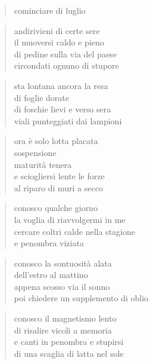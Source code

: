	\begin{verse}
		cominciare di luglio
	\end{verse}

	\begin{verse}
		andirivieni di certe sere\\
		il muoversi caldo e pieno\\
		di pedine sulla via del paese\\
		circondati ognuno di stupore
	\end{verse}

	\begin{verse}
		sta lontana ancora la resa\\
		di foglie dorate\\
		di foschie lievi e verso sera\\
		viali punteggiati dai lampioni
	\end{verse}

	\begin{verse}
		ora è solo lotta placata\\
		sospensione\\
		maturità tenera\\
		e sciogliersi lente le forze\\
		al riparo di muri a secco
	\end{verse}

\clearpage


	\begin{verse}
		conosco qualche giorno\\
		la voglia di riavvolgermi in me\\
		cercare coltri calde nella stagione\\
		e penombra viziata
	\end{verse}

	\begin{verse}
		conosco la sontuosità alata\\
		dell'estro al mattino\\
		appena scosso via il sonno\\
		poi chiedere un supplemento di oblio
	\end{verse}

	\begin{verse}
		conosco il magnetismo lento\\
		di risalire vicoli a memoria\\
		e canti in penombra e stupirsi\\
		di una scaglia di latta nel sole
	\end{verse}

